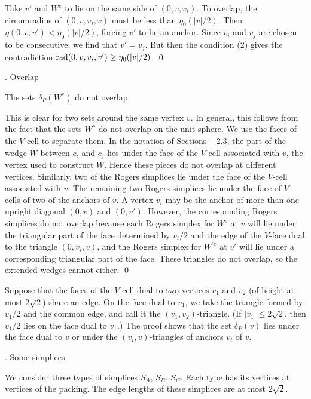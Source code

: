 Take $v'$ and $W^e$ to lie on the same side of $(0,v,v_i)$.
To overlap, the circumradius of $(0,v,v_i,v)$ must be less than $\eta_0(|v|/2)$.
Then $\eta(0,v,v')<\eta_0(|v|/2)$, forcing $v'$ to be an anchor.
Since $v_i$ and $v_j$ are chosen to be consecutive, we find that
$v'=v_j$.  But then the condition (2) gives the contradiction
$\operatorname{rad}(0,v,v_i,v')\ge\eta_0(|v|/2)$.
\qed
\enddemo

\subhead{}. Overlap\endsubhead

  The sets $\delta_P(W^e)$ do not overlap.
\endproclaim

  This is clear for two sets around the same vertex $v$.
In general, this follows from the fact that the sets $W^e$ do not
overlap on the unit sphere.  We use the faces of the $V$-cell
to separate them.  In the notation of Sections  -- 2.3,
the part of the wedge $W$ between $c_i$ and $c_j$ lies under the
face of the $V$-cell associated with $v$, the vertex used to
construct $W$.  Hence these pieces do not overlap at different vertices.
Similarly, two of the Rogers simplices lie under the face of the
$V$-cell associated with $v$.  The remaining two Rogers simplices
lie under the face of $V$-cells of two of the anchors of $v$.
A vertex $v_i$ may be the anchor of more than one upright diagonal $(0,v)$
and $(0,v')$.
However, the corresponding Rogers simplices do not overlap because each
Rogers simplex for $W^e$ at $v$ will lie under the triangular part of the face
determined by $v_i/2$ and the edge of the $V$-face dual to the
triangle $(0,v_i,v)$, and the Rogers simplex for $W^{\prime e}$ at $v'$
will lie under a corresponding triangular part of the face.  These
triangles do not overlap, so the extended wedges cannot either.
\qed
\enddemo

Suppose that the faces of the $V$-cell 
dual to two vertices $v_1$ and $v_2$ 
(of height at most $2\sqrt{2}$) share
an edge.  On the face dual to $v_1$, we take the triangle formed
by $v_1/2$ and the common edge, and call it the $(v_1,v_2)$-triangle.
(If $|v_1|\le2\sqrt{2}$, then $v_1/2$ lies on the face dual to $v_1$.)
The proof shows that the set $\delta_P(v)$ lies under the face dual to
$v$ or under the $(v_i,v)$-triangles of anchors $v_i$ of $v$.

\subhead{}. Some simplices\endsubhead

We consider three types of simplices $S_A$, $S_B$, $S_C$.  Each type
has its vertices at vertices of the packing.  The
edge lengths of these simplices are at most $2\sqrt{2}$.

